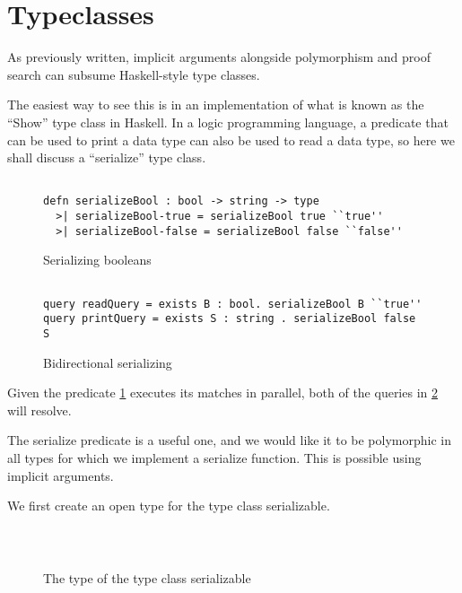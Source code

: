 \section{Typeclasses}


As previously written, implicit arguments alongside polymorphism and proof search can subsume Haskell-style type classes.

The easiest way to see this is in an implementation of what is known as the ``Show'' type class in Haskell.  
In a logic programming language, a predicate that can be used to print a data type can also be used to read a data type, so here we shall discuss a ``serialize'' type class.


\begin{figure}[H]
\begin{lstlisting}

defn serializeBool : bool -> string -> type
  >| serializeBool-true = serializeBool true ``true''
  >| serializeBool-false = serializeBool false ``false''

\end{lstlisting}
\caption{Serializing booleans}
\label{prog:serializing}
\end{figure}



\begin{figure}[H]
\begin{lstlisting}

query readQuery = exists B : bool. serializeBool B ``true''
query printQuery = exists S : string . serializeBool false S

\end{lstlisting}
\caption{Bidirectional serializing}
\label{prog:bidi}
\end{figure}

Given the predicate \ref{prog:serializing} executes its matches in parallel, both of the queries in 
\ref{prog:bidi} will resolve. 

The serialize predicate is a useful one, and we would like it to be polymorphic in all types
for which we implement a serialize function.  This is possible using implicit arguments.

We first create an open type for the type class serializable.

\begin{figure}[H]
\begin{lstlisting}



\end{lstlisting}
\caption{The type of the type class serializable }
\label{prog:sty}
\end{figure}


